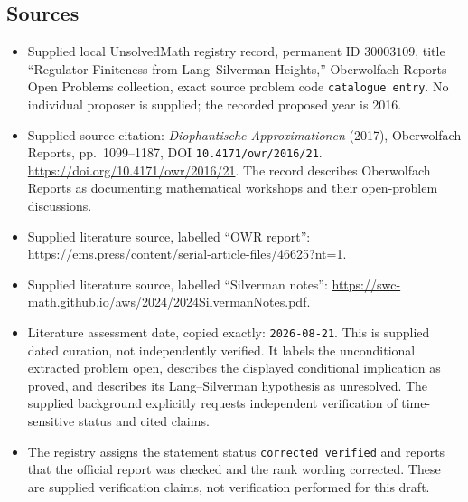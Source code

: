 \documentclass[11pt]{article}
\begin{document}
\subsection{Sources}
\begin{itemize}
\item Supplied local UnsolvedMath registry record, permanent ID \(30003109\), title ``Regulator Finiteness from Lang--Silverman Heights,'' Oberwolfach Reports Open Problems collection, exact source problem code \texttt{catalogue entry}. No individual proposer is supplied; the recorded proposed year is 2016.
\item Supplied source citation: \emph{Diophantische Approximationen} (2017), Oberwolfach Reports, pp.~1099--1187, DOI \texttt{10.4171/owr/2016/21}. \url{https://doi.org/10.4171/owr/2016/21}. The record describes Oberwolfach Reports as documenting mathematical workshops and their open-problem discussions.
\item Supplied literature source, labelled ``OWR report'': \url{https://ems.press/content/serial-article-files/46625?nt=1}.
\item Supplied literature source, labelled ``Silverman notes'': \url{https://swc-math.github.io/aws/2024/2024SilvermanNotes.pdf}.
\item Literature assessment date, copied exactly: \texttt{2026-08-21}. This is supplied dated curation, not independently verified. It labels the unconditional extracted problem open, describes the displayed conditional implication as proved, and describes its Lang--Silverman hypothesis as unresolved. The supplied background explicitly requests independent verification of time-sensitive status and cited claims.
\item The registry assigns the statement status \texttt{corrected\_verified} and reports that the official report was checked and the rank wording corrected. These are supplied verification claims, not verification performed for this draft.
\end{itemize}
\end{document}
